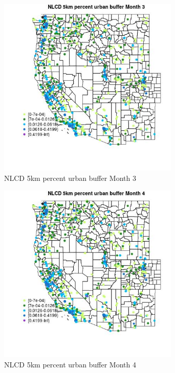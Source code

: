 \begin{figure} 
\centering  
\includegraphics[width=0.77\textwidth]{Code_Outputs/Report_ML_input_PM25_Step4_part_e_de_duplicated_aves_compiled_2019-05-21wNAs_MapObsMo3NLCD_5km_percent_urban_buffer.jpg} 
\caption{\label{fig:Report_ML_input_PM25_Step4_part_e_de_duplicated_aves_compiled_2019-05-21wNAsMapObsMo3NLCD_5km_percent_urban_buffer}NLCD 5km percent urban buffer Month 3} 
\end{figure} 
 

\clearpage 

\begin{figure} 
\centering  
\includegraphics[width=0.77\textwidth]{Code_Outputs/Report_ML_input_PM25_Step4_part_e_de_duplicated_aves_compiled_2019-05-21wNAs_MapObsMo4NLCD_5km_percent_urban_buffer.jpg} 
\caption{\label{fig:Report_ML_input_PM25_Step4_part_e_de_duplicated_aves_compiled_2019-05-21wNAsMapObsMo4NLCD_5km_percent_urban_buffer}NLCD 5km percent urban buffer Month 4} 
\end{figure} 
 

